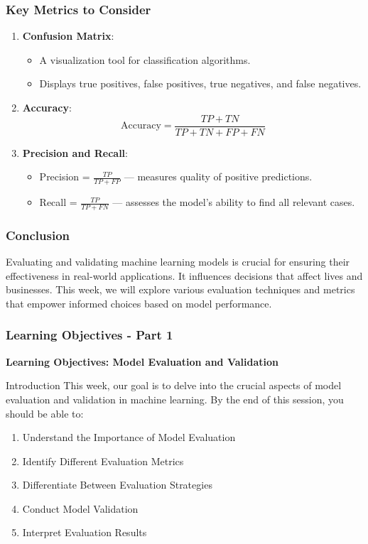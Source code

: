 \documentclass[aspectratio=169]{beamer}
\begin{document}
\begin{frame}[fragile]
    \frametitle{Key Metrics to Consider}
    \begin{enumerate}
        \item \textbf{Confusion Matrix}:
        \begin{itemize}
            \item A visualization tool for classification algorithms.
            \item Displays true positives, false positives, true negatives, and false negatives.
        \end{itemize}

        \item \textbf{Accuracy}:
        \begin{equation}
        \text{Accuracy} = \frac{TP + TN}{TP + TN + FP + FN}
        \end{equation}

        \item \textbf{Precision and Recall}:
        \begin{itemize}
            \item Precision = \( \frac{TP}{TP + FP} \) — measures quality of positive predictions.
            \item Recall = \( \frac{TP}{TP + FN} \) — assesses the model's ability to find all relevant cases.
        \end{itemize}
    \end{enumerate}
\end{frame}

\begin{frame}[fragile]
    \frametitle{Conclusion}
    Evaluating and validating machine learning models is crucial for ensuring their effectiveness in real-world applications. It influences decisions that affect lives and businesses. This week, we will explore various evaluation techniques and metrics that empower informed choices based on model performance.
\end{frame}

\begin{frame}[fragile]
    \frametitle{Learning Objectives - Part 1}
    \textbf{Learning Objectives: Model Evaluation and Validation}
    
    \begin{block}{Introduction}
        This week, our goal is to delve into the crucial aspects of model evaluation and validation in machine learning. By the end of this session, you should be able to:
    \end{block}
    
    \begin{enumerate}
        \item Understand the Importance of Model Evaluation
        \item Identify Different Evaluation Metrics
        \item Differentiate Between Evaluation Strategies
        \item Conduct Model Validation
        \item Interpret Evaluation Results
    \end{enumerate}
\end{frame}
\end{document}
